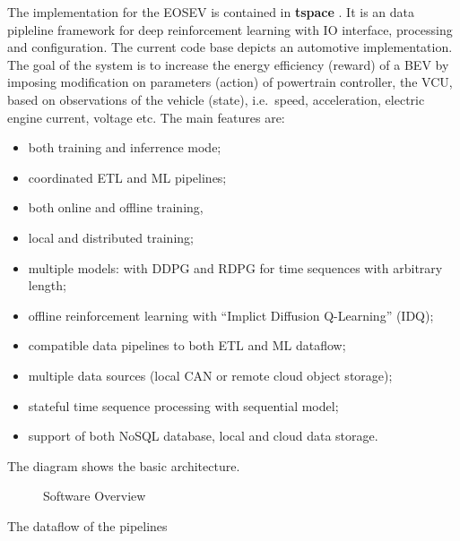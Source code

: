 \documentclass{article}
\begin{document}
\begin{appendices}
	The implementation for the EOSEV is contained in \textbf{tspace} \parencite{github:tspace}. It is an data pipleline framework for deep reinforcement learning with IO interface, processing and configuration. The current code base depicts an automotive implementation. The goal of the system is to increase the energy efficiency (reward) of a BEV by imposing modification on parameters (action) of powertrain controller, the VCU, based on observations of the vehicle (state), i.e.\ speed, acceleration, electric engine current, voltage etc. The main features are:
	\begin{itemize}
		\item both training and inferrence mode;
		\item coordinated ETL and ML pipelines;
		\item both online and offline training,
		\item local and distributed training;
		\item multiple models: with DDPG and RDPG for time sequences with arbitrary length;
		\item offline reinforcement learning with “Implict Diffusion Q-Learning” (IDQ);
		\item compatible data pipelines to both ETL and ML dataflow;
		\item multiple data sources (local CAN or remote cloud object storage);
		\item stateful time sequence processing with sequential model;
		\item support of both NoSQL database, local and cloud data storage.
	\end{itemize}

	The diagram shows the basic architecture.
	\begin{figure}[ht]
		\centering
		\def\svgwidth{0.6\columnwidth}
		
		\caption{\label{fig:Software overview} Software Overview}
	\end{figure}
	The dataflow of the pipelines
\end{appendices}
%
%

\end{document}
